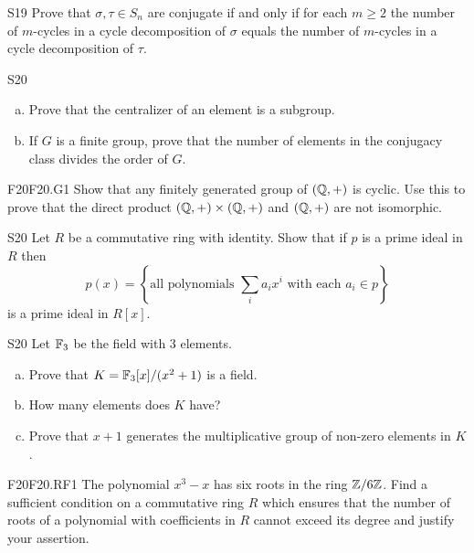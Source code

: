 \documentclass[../AlgebraQualSolutions.tex]{subfiles}
\begin{document}
\begin{prob}{S19}{}
Prove that $\sigma,\tau \in S_n$ are conjugate if and only if for each $m \geq 2$ the number of $m$-cycles in a cycle decomposition of $\sigma$ equals the number of $m$-cycles in a cycle decomposition of $\tau$.
\end{prob}

\begin{prob}{S20}{}
\begin{enumerate}[(a)]
\item Prove that the centralizer of an element is a subgroup.
\item If $G$ is a finite group, prove that the number of elements in the conjugacy class divides the order of $G$.
\end{enumerate}
\end{prob}

\begin{prob}{F20}{F20.G1}
Show that any finitely generated group of $(\mathbb{Q},+)$ is cyclic. Use this to prove that the direct product $(\mathbb{Q},+) \times (\mathbb{Q},+)$ and $(\mathbb{Q},+)$ are not isomorphic.
\end{prob}

\begin{prob}{S20}{}
Let $R$ be a commutative ring with identity. Show that if $p$ is a prime ideal in $R$ then
	\[p(x) = \left\{\textrm{all polynomials } \sum_i a_ix^i \textrm{ with each } a_i \in p \right\} \]
is a prime ideal in $R[x]$.
\end{prob}

\begin{prob}{S20}{}
Let $\mathbb{F}_3$ be the field with 3 elements.
\begin{enumerate}[(a)]
\item Prove that $K = \mathbb{F}_3[x]/(x^2 + 1)$ is a field.
\item How many elements does $K$ have?
\item Prove that $x+1$ generates the multiplicative group of non-zero elements in $K$.
\end{enumerate}
\end{prob}


\begin{prob}{F20}{F20.RF1}
The polynomial $x^3 - x$ has six roots in the ring $\mathbb{Z}/6\mathbb{Z}$. Find a sufficient condition on a commutative ring $R$ which ensures that the number of roots of a polynomial with coefficients in $R$ cannot exceed its degree and justify your assertion.
\end{prob}
\end{document}
